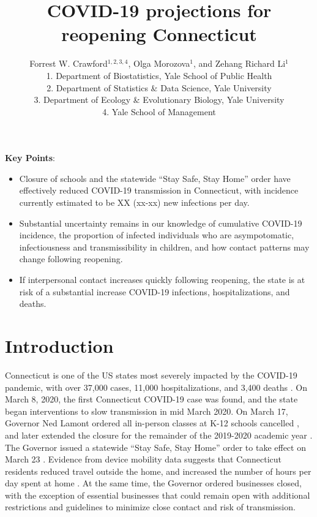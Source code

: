 \documentclass[11pt]{article}
\title{COVID-19 projections for reopening Connecticut}
\author{
  Forrest W. Crawford$^{1,2,3,4}$,
  Olga Morozova$^{1}$, 
  and
  Zehang Richard Li$^1$
  \\[1em]
\small 1. Department of Biostatistics, Yale School of Public Health \\
\small 2. Department of Statistics \& Data Science, Yale University \\
\small 3. Department of Ecology \& Evolutionary Biology, Yale University \\
\small 4. Yale School of Management }
\begin{document}
\maketitle


\textbf{Key Points}:
\vspace{-0.5em}
\begin{itemize}[itemsep=0em, parsep=0em, topsep=0em]
  \item Closure of schools and the statewide ``Stay Safe, Stay Home'' order have effectively reduced COVID-19 transmission in Connecticut, with incidence currently estimated to be XX (xx-xx) new infections per day.  
  \item Substantial uncertainty remains in our knowledge of cumulative COVID-19 incidence, the proportion of infected individuals who are asympotomatic, infectiousness and transmissibility in children, and how contact patterns may change following reopening.  
  \item If interpersonal contact increases quickly following reopening, the state is at risk of a substantial increase COVID-19 infections, hospitalizations, and deaths.
\end{itemize}



\section*{Introduction}

Connecticut is one of the US states most severely impacted by the COVID-19 pandemic, with over 37,000 cases, 11,000 hospitalizations, and 3,400 deaths \citep{nyt2020Connecticut,atlantic2020data}.  On March 8, 2020, the first Connecticut COVID-19 case was found, and the state began interventions to slow transmission in mid March 2020.  On March 17, Governor Ned Lamont ordered all in-person classes at K-12 schools cancelled \citep{lamont2020exec7c}, and later extended the closure for the remainder of the 2019-2020 academic year \citep{lamont2020exec7l,lamont2020exec7x,lamont2020exec7ii}.  The Governor issued a statewide ``Stay Safe, Stay Home'' order to take effect on March 23 \citep{lamont2020exec7h}.  Evidence from device mobility data suggests that Connecticut residents reduced travel outside the home, and increased the number of hours per day spent at home \citep{google2020covid,facebook2020covid}. At the same time, the Governor ordered businesses closed, with the exception of essential businesses that could remain open with additional restrictions and guidelines to minimize close contact and risk of transmission. 
\end{document}
